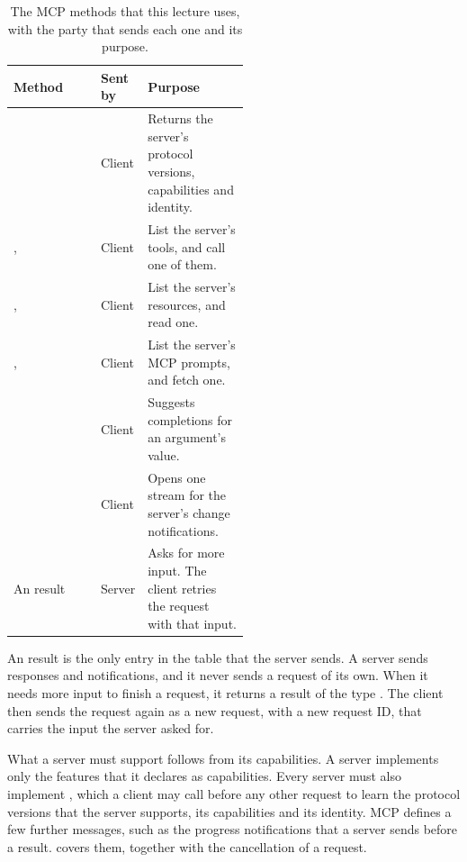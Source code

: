 \begin{table}[htbp]
  \caption{The MCP methods that this lecture uses, with the party that sends each one and its
  purpose.}
  \label{tab:mcp-methods}
  \begin{adjustbox}{width=\linewidth}\begin{tabularx}{\linewidth}{L{0.37\linewidth}L{0.15\linewidth}X}
    \toprule
    \textbf{Method} & \textbf{Sent by} & \textbf{Purpose} \\
    \midrule
     & Client & Returns the server's protocol versions, capabilities and identity. \\
    ,  & Client & List the server's tools, and call one of them. \\
    ,  & Client & List the server's resources, and read one. \\
    ,  & Client & List the server's MCP prompts, and fetch one. \\
     & Client & Suggests completions for an argument's value. \\
     & Client & Opens one stream for the server's change notifications. \\
    An  result & Server & Asks for more input. The client retries the request with that input. \\
    \bottomrule
  \end{tabularx}\end{adjustbox}
\end{table}

An  result is the only entry in the table that the server sends. A server
sends responses and notifications, and it never sends a request of its own. When it needs more input
to finish a request, it returns a result of the type . The client then
sends the request again as a new request, with a new request ID, that carries the input the server
asked for.

What a server must support follows from its capabilities. A server implements only the features
that it declares as capabilities. Every server must also implement ,
which a client may call before any other request to learn the protocol versions that the server
supports, its capabilities and its identity. MCP defines a few further messages, such as the
progress notifications that a server sends before a result.  covers them,
together with the cancellation of a request.

